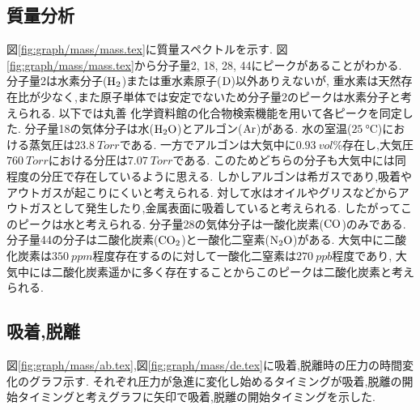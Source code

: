 \subsection{質量分析}
図\ref{fig:graph/mass/mass.tex}に質量スペクトルを示す.
図\ref{fig:graph/mass/mass.tex}から分子量2, 18, 28, 44にピークがあることがわかる.
分子量2は水素分子(${\rm H}_2$)または重水素原子($\rm D$)以外ありえないが,
重水素は天然存在比が少なく,また原子単体では安定でないため分子量2のピークは水素分子と考えられる.
以下では丸善 化学資料館\cite{kagaku:online}の化合物検索機能を用いて各ピークを同定した.
分子量18の気体分子は水(${\rm H}_2{\rm O}$)とアルゴン(${\rm Ar}$)がある.
水の室温($25\ \si{\degreeCelsius}$)における蒸気圧は$23.8\ \si{Torr}$である.\cite{kagakuMizu:online}
一方でアルゴンは大気中に$0.93\ vol\%$存在し,大気圧$760\ \si{Torr}$における分圧は$7.07\ \si{Torr}$である.\cite{rikaAr:online}
このためどちらの分子も大気中には同程度の分圧で存在しているように思える.
しかしアルゴンは希ガスであり,吸着やアウトガスが起こりにくいと考えられる.
対して水はオイルやグリスなどからアウトガスとして発生したり,金属表面に吸着していると考えられる.
したがってこのピークは水と考えられる.
分子量28の気体分子は一酸化炭素(${\rm CO}$)のみである.
分子量44の分子は二酸化炭素(${\rm CO}_2$)と一酸化二窒素(${\rm N}_2{\rm O}$)がある.
大気中に二酸化炭素は$350\ \si{ppm}$程度存在するのに対して一酸化二窒素は$270\ \si{ppb}$程度であり,
大気中には二酸化炭素遥かに多く存在することからこのピークは二酸化炭素と考えられる.\cite{Japan53:online}
\subsection{吸着,脱離}
図\ref{fig:graph/mass/ab.tex},図\ref{fig:graph/mass/de.tex}に吸着,脱離時の圧力の時間変化のグラフ示す.
それぞれ圧力が急進に変化し始めるタイミングが吸着,脱離の開始タイミングと考えグラフに矢印で吸着,脱離の開始タイミングを示した.
